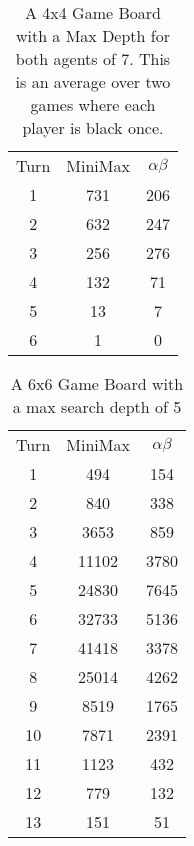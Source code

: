 \documentclass[12pt,letterpaper]{article}
\begin{document}
\begin{table}[h!]
\centering
\begin{tabular}{|c|c|c|}
\hline
Turn & MiniMax & $\alpha \beta$ \\
1 & 731 & 206 \\
2 & 632 & 247 \\
3 & 256 & 276 \\
4 & 132 & 71 \\ 
5 & 13 & 7 \\ 
6 & 1 & 0 \\
\hline
\end{tabular}
\caption{A 4x4 Game Board with a Max Depth for both agents of 7. This is an average over two games where each player is black once. }
\end{table}


\begin{table}[h!]
\centering
\begin{tabular}{|c|c|c|}
\hline
Turn & MiniMax & $\alpha \beta$ \\
1 & 494 & 154 \\ 
2 & 840 & 338 \\
3 & 3653 & 859 \\
4 & 11102 & 3780 \\ 
5 & 24830 & 7645 \\ 
6 & 32733 & 5136 \\
7 & 41418 & 3378 \\ 
8 & 25014 & 4262 \\ 
9 & 8519 & 1765 \\ 
10 & 7871 & 2391 \\
11 & 1123 & 432 \\ 
12 & 779 & 132 \\ 
13 & 151 & 51 \\
\hline
\end{tabular}
\caption{A 6x6 Game Board with a max search depth of 5}
\end{table}
\end{document}
